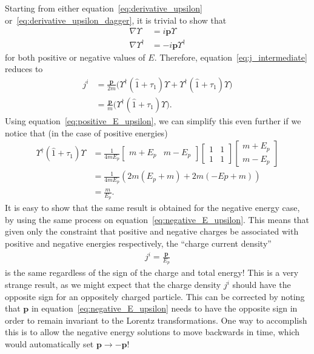 \documentclass[titlepage,letterpaper,onecolumn,11pt,final]{report}
\numberwithin{equation}{section}
\numberwithin{figure}{section}
\begin{document}
Starting from either equation~\ref{eq:derivative_upsilon} or~\ref{eq:derivative_upsilon_dagger}, it is trivial to show that 
\begin{subequations}
\begin{align}
	\nabla \Upsilon &= i \mathbf{p} \Upsilon \\
	\nabla \Upsilon^{\dagger} &= -i \mathbf{p} \Upsilon^{\dagger}
\end{align}
\end{subequations}
%
for both positive or negative values of $E$. Therefore, equation~\ref{eq:j_intermediate} reduces to
\begin{equation}
\begin{split}
	\label{eq:j_intermediate2}
	j^{i} &= \frac{\mathbf{p}}{2 m} \bigg( \Upsilon^{\dagger} (\hat{1} + \tau_{1}) \Upsilon + \Upsilon^{\dagger} (\hat{1} + \tau_{1}) \Upsilon \bigg) \\
	&= \frac{\mathbf{p}}{m} \bigg( \Upsilon^{\dagger} (\hat{1} + \tau_{1}) \Upsilon \bigg) .
\end{split}
\end{equation}
%
Using equation~\ref{eq:positive_E_upsilon}, we can simplify this even further if we notice that (in the case of positive energies)
\begin{equation}
\begin{split}
	\Upsilon^{\dagger} (\hat{1} + \tau_{1}) \Upsilon &=	\frac{1}{4 m E_{p}}
	\begin{bmatrix}
		m + E_{p} & m - E_{p}
	\end{bmatrix}
	\begin{bmatrix}
		1 & 1 \\[6pt]
		1 & 1
	\end{bmatrix}
	\begin{bmatrix}
		m + E_{p} \\[6pt]
		m - E_{p}
	\end{bmatrix}\\
	&= \frac{1}{4 m E_{p}} \left( 2m (E_{p} + m) + 2m ( -E{p} + m) \right) \\
	&= \frac{m}{E_{p}} .
\end{split}
\end{equation}
%
It is easy to show that the same result is obtained for the negative energy case, by using the same process on equation~\ref{eq:negative_E_upsilon}. This means that given only the constraint that positive and negative charges be associated with positive and negative energies respectively, the ``charge current density''
\begin{gather}
	\label{eq:j_result}
	j^{i} = \frac{\mathbf{p}}{E_{p}}
\end{gather}
is the same regardless of the sign of the charge and total energy! This is a very strange result, as we might expect that the charge density $j^{i}$ should have the opposite sign for an oppositely charged particle. This can be corrected by noting that $\mathbf{p}$ in equation~\ref{eq:negative_E_upsilon} needs to have the opposite sign in order to remain invariant to the Lorentz transformations. One way to accomplish this is to allow the negative energy solutions to move backwards in time, which would automatically set $\mathbf{p} \rightarrow -\mathbf{p}$!
\end{document}
